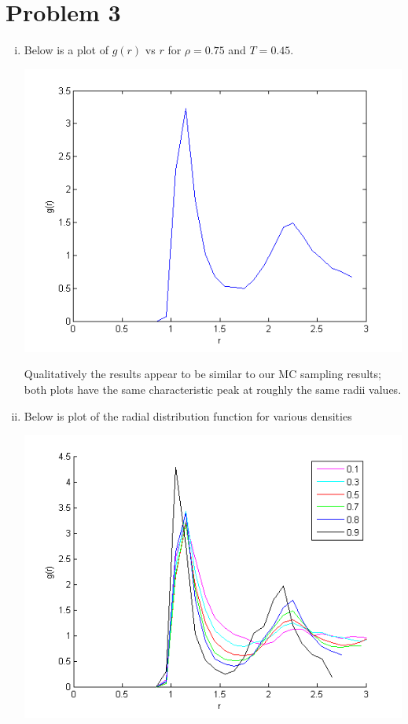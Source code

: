 \documentclass{article}
\begin{document}
\section*{Problem 3}
\begin{enumerate}[i.]
  \item Below is a plot of $g(r)$ vs $r$ for $\rho=0.75$ and $T=0.45$.
    \begin{center}
      \includegraphics[scale=0.5]{3i}
    \end{center}

    Qualitatively the results appear to be similar to our MC sampling results; both plots have the same characteristic peak at roughly the same radii values.

  \item Below is plot of the radial distribution function for various densities
    \begin{center}
      \includegraphics[scale=0.7]{3ii}
    \end{center}


\end{enumerate}
\end{document}
